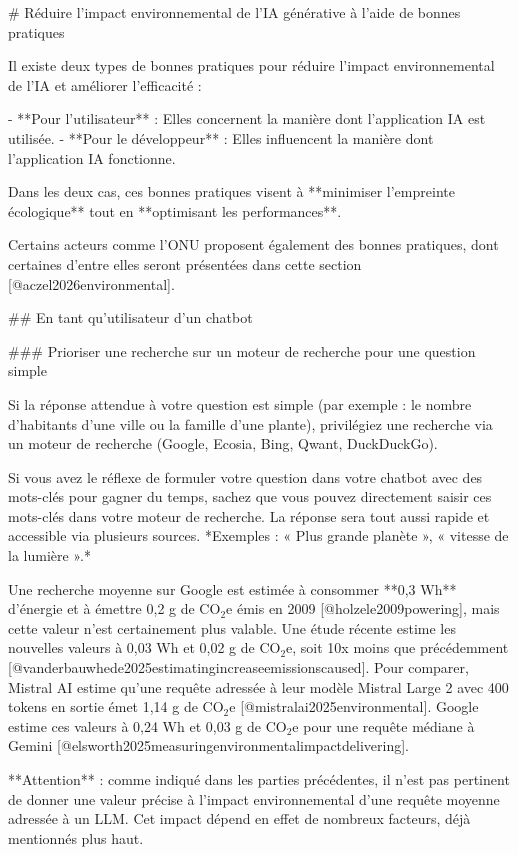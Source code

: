 # Réduire l'impact environnemental de l'IA générative à l'aide de bonnes pratiques

Il existe deux types de bonnes pratiques pour réduire l'impact environnemental de l'IA et améliorer l'efficacité :

- **Pour l'utilisateur** : Elles concernent la manière dont l'application IA est utilisée.
- **Pour le développeur** : Elles influencent la manière dont l'application IA fonctionne.

Dans les deux cas, ces bonnes pratiques visent à **minimiser l'empreinte écologique** tout en **optimisant les performances**.

Certains acteurs comme l'ONU proposent également des bonnes pratiques, dont certaines d'entre elles seront présentées dans cette section [@aczel2026environmental].

## En tant qu'utilisateur d'un chatbot

### Prioriser une recherche sur un moteur de recherche pour une question simple

Si la réponse attendue à votre question est simple (par exemple : le nombre d'habitants d'une ville ou la famille d'une plante), privilégiez une recherche via un moteur de recherche (Google, Ecosia, Bing, Qwant, DuckDuckGo).

Si vous avez le réflexe de formuler votre question dans votre chatbot avec des mots-clés pour gagner du temps, sachez que vous pouvez directement saisir ces mots-clés dans votre moteur de recherche. La réponse sera tout aussi rapide et accessible via plusieurs sources.
*Exemples : « Plus grande planète », « vitesse de la lumière ».*

Une recherche moyenne sur Google est estimée à consommer **0,3 Wh** d'énergie et à émettre 0,2 g de CO$_2$e émis en 2009 [@holzele2009powering], mais cette valeur n'est certainement plus valable. Une étude récente estime les nouvelles valeurs à 0,03 Wh et 0,02 g de CO$_2$e, soit 10x moins que précédemment [@vanderbauwhede2025estimatingincreaseemissionscaused].
Pour comparer, Mistral AI estime qu'une requête adressée à leur modèle Mistral Large 2 avec 400 tokens en sortie émet 1,14 g de CO$_2$e [@mistralai2025environmental].
Google estime ces valeurs à 0,24 Wh et 0,03 g de CO$_2$e pour une requête médiane à Gemini [@elsworth2025measuringenvironmentalimpactdelivering].

**Attention** : comme indiqué dans les parties précédentes, il n'est pas pertinent de donner une valeur précise à l'impact environnemental d'une requête moyenne adressée à un LLM. Cet impact dépend en effet de nombreux facteurs, déjà mentionnés plus haut.


